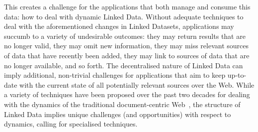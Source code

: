 \documentclass[sw]{iosart2x}
\begin{document}
This creates a challenge for the applications that both manage and consume this data: how to deal with dynamic Linked Data.
Without adequate techniques to deal with the aforementioned changes in Linked Datasets, applications may succumb to a variety of undesirable outcomes: they may return results that are no longer valid, they may omit new information, they may miss relevant sources of data that have recently been added, they may link to sources of data that are no longer available, and so forth. The decentralised nature of Linked Data can imply additional, non-trivial challenges for applications that aim to keep up-to-date with the current state of all potentially relevant sources over the Web. While a variety of techniques have been proposed over the past two decades for dealing with the dynamics of the traditional document-centric Web~\cite{GaddeCR01,RisvikM02}, the structure of Linked Data implies unique challenges (and opportunities) with respect to dynamics, calling for specialised techniques.
\medskip





\end{document}
